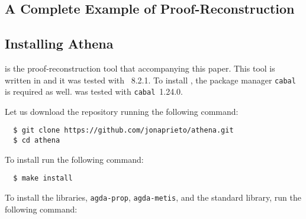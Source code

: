 \documentclass[../main.tex]{subfiles}
\begin{document}
\begin{subappendices}


\clearpage
\section{A Complete Example of Proof-Reconstruction}
\label{app:complete-example}

\subsection{Installing Athena}

\Athena is the proof-reconstruction tool that accompanying this paper.
This tool is written in \Haskell and it was tested with
~8.2.1. To install \Athena, the package manager \verb!cabal!
is required as well. \Athena was tested with \verb!cabal!~1.24.0.

Let us download the \Athena repository running the following command:

\begin{verbatim}
  $ git clone https://github.com/jonaprieto/athena.git
  $ cd athena
\end{verbatim}

To install \Athena run the following command:

\begin{verbatim}
  $ make install
\end{verbatim}

To install the \Agda libraries, \verb!agda-prop!, \verb!agda-metis!, and
the \Agda standard library, run the following command:


\end{subappendices}
\end{document}
